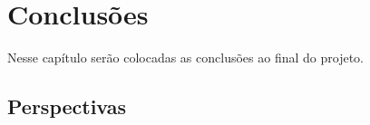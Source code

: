 \section{Conclusões}
Nesse capítulo serão colocadas as conclusões ao final do projeto.
\subsection{Perspectivas}

\newpage